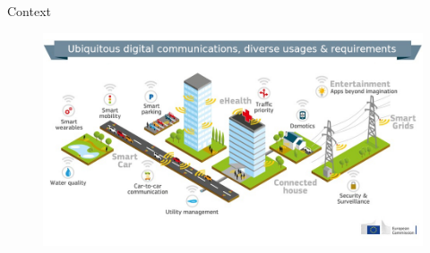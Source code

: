 


\begin{frame}{Context}
  \vfill
  \begin{figure}[htp]
  \centering
  \includegraphics[scale=0.40]{pics/5G_modif}
  \end{figure}
  \vfill
\end{frame}


